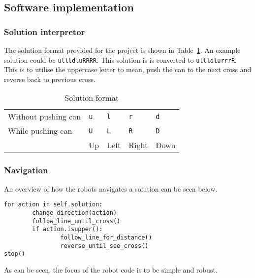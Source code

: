 \documentclass[../../main.tex]{subfiles}
\begin{document}
\subsection{Software implementation}%
\label{sub:software_implementation}

\subsubsection{Solution interpretor}%
\label{ssub:solution_intepretor}

The solution format provided for the project is shown in Table~\ref{tab:solution_format}.
An example solution could be \texttt{ullldluRRRR}.
This solution is is converted to \texttt{ullldlurrrR}. This is to utilise the uppercase letter to
mean, push the can to the next cross and reverse back to previous cross.

\begin{table}[h]
	\centering
	\caption{Solution format}
	\label{tab:solution_format}
	\begin{tabular}{*{5}{l}}
		\toprule
		Without pushing can & \tt u &\tt  l & \tt r & \tt d \\
		While pushing can & \tt U & \tt L & \tt R & \tt D \\
		\cmidrule{2-5}
											& Up & Left & Right & Down\\
											\bottomrule
	\end{tabular}
\end{table}


\subsubsection{Navigation}%
\label{ssub:navigation}

An overview of how the robots navigates a solution can be seen below.
\begin{verbatim}
for action in self.solution:
		change_direction(action)
		follow_line_until_cross()
		if action.isupper():
				follow_line_for_distance()
				reverse_until_see_cross()
stop()
\end{verbatim}
As can be seen, the focus of the robot code is to be simple and robust.








	
\end{document}
